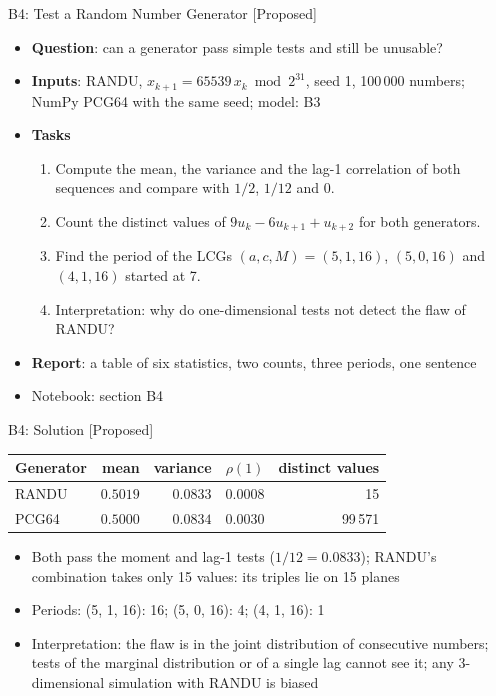 \begin{frame}{B4: Test a Random Number Generator [Proposed]}
\itemsize{\footnotesize}
\begin{itemize}
\item \textbf{Question}: can a generator pass simple tests and still be unusable?
\item \textbf{Inputs}: RANDU, $x_{k+1} = 65539\,x_k \bmod 2^{31}$, seed 1, 100\,000 numbers; NumPy PCG64 with the same seed; model: B3
\item \textbf{Tasks}
\begin{enumerate}
    \item Compute the mean, the variance and the lag-1 correlation of both sequences and compare with $1/2$, $1/12$ and 0.
    \item Count the distinct values of $9u_k - 6u_{k+1} + u_{k+2}$ for both generators.
    \item Find the period of the LCGs $(a, c, M) = (5, 1, 16)$, $(5, 0, 16)$ and $(4, 1, 16)$ started at 7.
    \item Interpretation: why do one-dimensional tests not detect the flaw of RANDU?
\end{enumerate}
\item \textbf{Report}: a table of six statistics, two counts, three periods, one sentence
\item Notebook: section B4
\end{itemize}
\end{frame}

\ifsolutions
\begin{frame}{B4: Solution [Proposed]}
\itemsize{\footnotesize}
\begin{center}
\footnotesize
\begin{tabular}{lrrrr}
\toprule
Generator & mean & variance & $\rho(1)$ & distinct values \\
\midrule
RANDU & $0.5019$ & $0.0833$ & $0.0008$ & 15 \\
PCG64 & $0.5000$ & $0.0834$ & $0.0030$ & 99\,571 \\
\bottomrule
\end{tabular}
\end{center}
\begin{itemize}
    \item Both pass the moment and lag-1 tests ($1/12 = 0.0833$); RANDU's combination takes only 15 values: its triples lie on 15 planes
    \item Periods: (5, 1, 16): 16; (5, 0, 16): 4; (4, 1, 16): 1
    \item Interpretation: the flaw is in the joint distribution of consecutive numbers; tests of the marginal distribution or of a single lag cannot see it; any 3-dimensional simulation with RANDU is biased
\end{itemize}
\end{frame}
\fi

